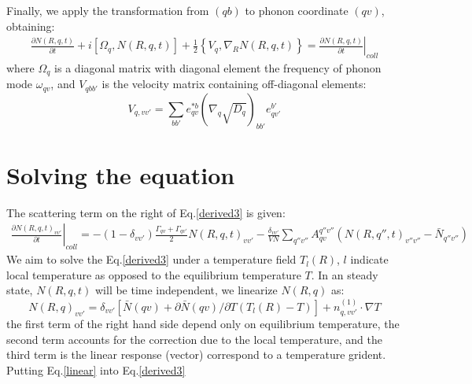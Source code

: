 \documentclass{article}
\begin{document}
Finally, we apply the transformation from $(qb)$ to phonon coordinate $(qv)$, obtaining:
\begin{align}
    \frac{\partial N(R,q,t)}{\partial t} + i \left[ \Omega_{q},N(R,q,t) \right] + 
        \frac{1}{2} \left\{ V_{q}, \nabla_R N(R,q,t) \right\} 
        = \left. \frac{\partial N(R,q,t) }{\partial t} \right|_{coll} \label{derived3}
\end{align}
where $\Omega_q$ is a diagonal matrix with diagonal element the frequency of phonon mode $\omega_{qv}$, and $V_{qbb'}$ is 
the velocity matrix containing off-diagonal elements:
\begin{equation}
    V_{q,vv'} = \sum_{bb'} e^{*b}_{qv} ( \nabla_q\sqrt{D_q})_{bb'} e^{b'}_{qv'}
\end{equation}

\section{Solving the equation}
The scattering term on the right of Eq.\ref{derived3} is given:
\begin{align}
    \left. \frac{\partial N(R,q,t)_{vv'} }{\partial t} \right|_{coll} 
    = - (1-\delta_{vv'}) \frac{\Gamma_{qv} + \Gamma_{qv'}}{2} N(R,q,t)_{vv'} 
      - \frac{\delta_{vv'}}{VN} \sum_{q''v''} A_{qv}^{q''v''}  (N(R,q'',t)_{v''v''} - \bar{N}_{q''v''} )
\end{align}
We aim to solve the Eq.\ref{derived3} under a temperature field $T_l(R)$, $l$ indicate local temperature 
as opposed to the equilibrium temperature $T$. In an steady state, $N(R,q,t)$ will be time independent, we 
linearize $N(R,q)$ as:
\begin{equation}
    N(R,q)_{vv'} = \delta_{vv'} \left[ \bar{N}(qv) + \partial \bar{N}(qv)/\partial T (T_l(R)-T) \right] + n^{(1)}_{q,vv'} \cdot \nabla T \label{linear}
\end{equation}
the first term of the right hand side depend only on equilibrium temperature, the second term accounts for the correction 
due to the local temperature, and the third term is the linear response (vector) correspond to a temperature grident.
Putting Eq.\ref{linear} into Eq.\ref{derived3}
\end{document}
